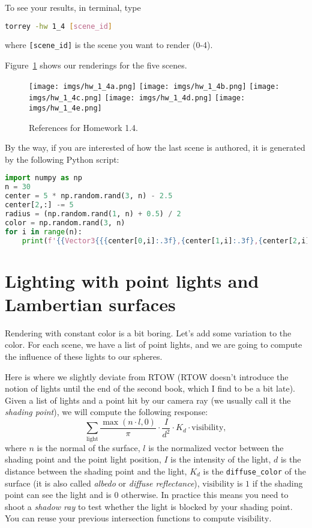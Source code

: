 To see your results, in terminal, type
\begin{lstlisting}[language=bash]
  torrey -hw 1_4 [scene_id]
\end{lstlisting}
where \lstinline{[scene_id]} is the scene you want to render (0-4).

Figure~\ref{fig:hw_1_4} shows our renderings for the five scenes.

\begin{figure}[ht]
    \centering
    \texttt{[image: imgs/hw\_1\_4a.png]}
    \texttt{[image: imgs/hw\_1\_4b.png]}
    \texttt{[image: imgs/hw\_1\_4c.png]}
    \texttt{[image: imgs/hw\_1\_4d.png]}
    \texttt{[image: imgs/hw\_1\_4e.png]}
    \caption{References for Homework 1.4.}
    \label{fig:hw_1_4}
\end{figure}

By the way, if you are interested of how the last scene is authored, it is generated by the following Python script:
\begin{lstlisting}[language=Python]
import numpy as np
n = 30
center = 5 * np.random.rand(3, n) - 2.5
center[2,:] -= 5
radius = (np.random.rand(1, n) + 0.5) / 2
color = np.random.rand(3, n)
for i in range(n):
    print(f'{{Vector3{{{center[0,i]:.3f},{center[1,i]:.3f},{center[2,i]:.3f}}}, {radius[0, i]:.3f}, Vector3{{{color[0,i]:.3f},{color[1,i]:.3f},{color[2,i]:.3f}}}}},')
\end{lstlisting}

\section{Lighting with point lights and Lambertian surfaces}
Rendering with constant color is a bit boring. Let's add some variation to the color. For each scene, we have a list of point lights, and we are going to compute the influence of these lights to our spheres.

Here is where we slightly deviate from RTOW (RTOW doesn't introduce the notion of lights until the end of the second book, which I find to be a bit late). Given a list of lights and a point hit by our camera ray (we usually call it the \emph{shading point}), we will compute the following response:
\begin{equation}
    \sum_{\text{light}} \frac{\max\left(n \cdot l, 0\right)}{\pi} \cdot \frac{I}{d^2} \cdot K_d \cdot \text{visibility},
    \label{eq:lighting}
\end{equation}
where $n$ is the normal of the surface, $l$ is the normalized vector between the shading point and the point light position, $I$ is the intensity of the light, $d$ is the distance between the shading point and the light, $K_d$ is the \lstinline{diffuse_color} of the surface (it is also called \emph{albedo} or \emph{diffuse reflectance}), $\text{visibility}$ is $1$ if the shading point can see the light and is $0$ otherwise. In practice this means you need to shoot a \emph{shadow ray} to test whether the light is blocked by your shading point. You can reuse your previous intersection functions to compute $\text{visibility}$.

